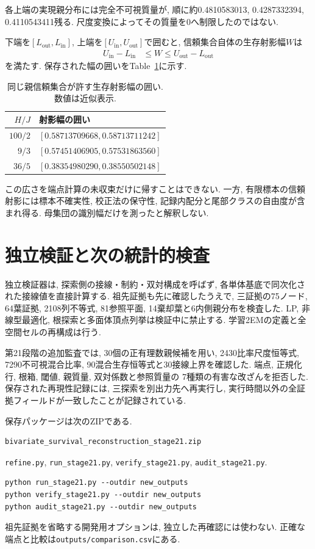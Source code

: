 各上端の実現親分布には完全不可視質量が,
順に約0.4810583013, 0.4287332394, 0.4110543411残る.
尺度変換によってその質量を0へ制限したのではない.

下端を$[L_{\mathrm{out}},L_{\mathrm{in}}]$,
上端を$[U_{\mathrm{in}},U_{\mathrm{out}}]$で囲むと,
信頼集合自体の生存射影幅$W$は
\begin{align}
U_{\mathrm{in}}-L_{\mathrm{in}}&\le W
\le U_{\mathrm{out}}-L_{\mathrm{out}}
\label{eq:stage21_width_bracket}
\end{align}
を満たす. 保存された幅の囲いをTable~\ref{tab:stage21_set_width}に示す.
\begin{table}[htbp]
\centering
\caption{同じ親信頼集合が許す生存射影幅の囲い. 数値は近似表示.}
\label{tab:stage21_set_width}
\begin{tabular}{rl}
\toprule
$H/J$ & 射影幅の囲い \\
\midrule
$100/2$ & $[0.58713709668,0.58713711242]$ \\
$9/3$ & $[0.57451406905,0.57531863560]$ \\
$36/5$ & $[0.38354980290,0.38550502148]$ \\
\bottomrule
\end{tabular}
\end{table}
この広さを端点計算の未収束だけに帰すことはできない.
一方, 有限標本の信頼射影には標本不確実性, 校正法の保守性,
記録内配分と尾部クラスの自由度が含まれ得る.
母集団の識別幅だけを測ったと解釈しない.

\section{独立検証と次の統計的検査}
\label{sec:stage21_record}

独立検証器は, 探索側の接線・制約・双対構成を呼ばず,
各単体基底で同次化された接線値を直接計算する.
祖先証拠も先に確認したうえで,
三証拠の75ノード, 64葉証拠, 2108列不等式,
81参照平面, 14棄却葉と6内側親分布を検査した.
LP, 非線型最適化, 根探索と多面体頂点列挙は検証中に禁止する.
学習2EMの定義と全空間セルの再構成は行う.

第21段階の追加監査では, 30個の正有理数親候補を用い,
2430比率尺度恒等式, 7290不可視混合比率,
90混合生存恒等式と30接線上界を確認した.
端点, 正規化行, 根箱, 閾値, 親質量, 双対係数と参照質量の
7種類の有害な改ざんを拒否した.
保存された再現性記録には, 三探索を別出力先へ再実行し,
実行時間以外の全証拠フィールドが一致したことが記録されている.

保存パッケージは次のZIPである.
\begin{verbatim}
bivariate_survival_reconstruction_stage21.zip
\end{verbatim}
\allowbreak\texttt{refine.py},
\allowbreak\texttt{run\_stage21.py},
\allowbreak\texttt{verify\_stage21.py},
\allowbreak\texttt{audit\_stage21.py}.
\begin{verbatim}
python run_stage21.py --outdir new_outputs
python verify_stage21.py --outdir new_outputs
python audit_stage21.py --outdir new_outputs
\end{verbatim}
祖先証拠を省略する開発用オプションは, 独立した再確認には使わない.
正確な端点と比較は\nolinkurl{outputs/comparison.csv}にある.

